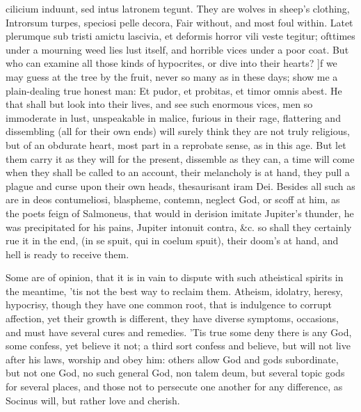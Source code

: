 {cilicium induunt, sed intus latronem tegunt. They are wolves in sheep's
clothing, Introrsum turpes, speciosi pelle decora, Fair without, and
most foul within. Latet plerumque sub tristi amictu lascivia, et
deformis horror vili veste tegitur; ofttimes under a mourning weed lies
lust itself, and horrible vices under a poor coat. But who can examine
all those kinds of hypocrites, or dive into their hearts? ]f we may
guess at the tree by the fruit, never so many as in these days; show me
a plain-dealing true honest man: Et pudor, et probitas, et timor omnis
abest. He that shall but look into their lives, and see such enormous
vices, men so immoderate in lust, unspeakable in malice, furious in
their rage, flattering and dissembling (all for their own ends) will
surely think they are not truly religious, but of an obdurate heart,
most part in a reprobate sense, as in this age. But let them carry it
as they will for the present, dissemble as they can, a time will come
when they shall be called to an account, their melancholy is at hand,
they pull a plague and curse upon their own heads, thesaurisant iram
Dei. Besides all such as are in deos contumeliosi, blaspheme, contemn,
neglect God, or scoff at him, as the poets feign of Salmoneus, that
would in derision imitate Jupiter's thunder, he was precipitated for
his pains, Jupiter intonuit contra, \&c. so shall they certainly rue it
in the end, (in se spuit, qui in coelum spuit), their doom's at
hand, and hell is ready to receive them.

Some are of opinion, that it is in vain to dispute with such
atheistical spirits in the meantime, 'tis not the best way to reclaim
them. Atheism, idolatry, heresy, hypocrisy, though they have one common
root, that is indulgence to corrupt affection, yet their growth is
different, they have diverse symptoms, occasions, and must have several
cures and remedies. 'Tis true some deny there is any God, some confess,
yet believe it not; a third sort confess and believe, but will not live
after his laws, worship and obey him: others allow God and gods
subordinate, but not one God, no such general God, non talem deum, but
several topic gods for several places, and those not to persecute one
another for any difference, as Socinus will, but rather love and
cherish.

}
